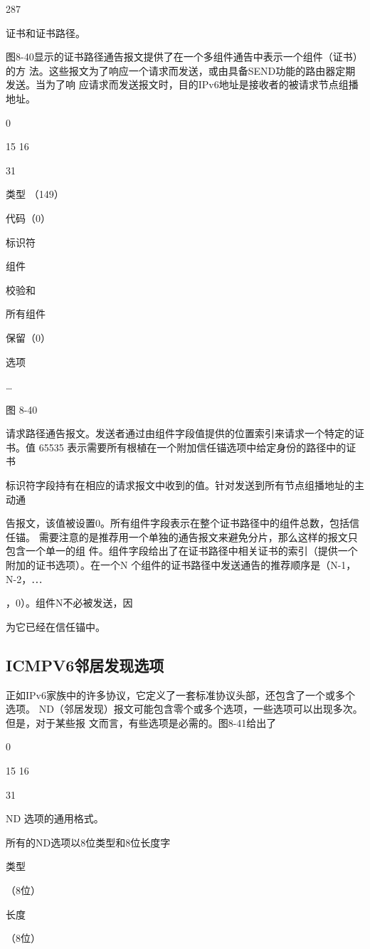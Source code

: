 287

证书和证书路径。

图8-40显示的证书路径通告报文提供了在一个多组件通告中表示一个组件（证书）的方
法。这些报文为了响应一个请求而发送，或由具备SEND功能的路由器定期发送。当为了响
应请求而发送报文时，目的IPv6地址是接收者的被请求节点组播地址。

0

15 16

31

类型 （149）

代码（0）

标识符

组件

校验和

所有组件

保留（0）

选项

…

图 8-40

请求路径通告报文。发送者通过由组件字段值提供的位置索引来请求一个特定的证书。值
65535 表示需要所有根植在一个附加信任锚选项中给定身份的路径中的证书

标识符字段持有在相应的请求报文中收到的值。针对发送到所有节点组播地址的主动通

告报文，该值被设置0。所有组件字段表示在整个证书路径中的组件总数，包括信任锚。
需要注意的是推荐用一个单独的通告报文来避免分片，那么这样的报文只包含一个单一的组
件。组件字段给出了在证书路径中相关证书的索引（提供一个附加的证书选项）。在一个N
个组件的证书路径中发送通告的推荐顺序是（N-1，N-2，⋯

，0）。组件N不必被发送，因

为它已经在信任锚中。

\subsection{ICMPV6邻居发现选项}
正如IPv6家族中的许多协议，它定义了一套标准协议头部，还包含了一个或多个选项。
ND（邻居发现）报文可能包含零个或多个选项，一些选项可以出现多次。但是，对于某些报
文而言，有些选项是必需的。图8-41给出了

0

15 16

31

ND 选项的通用格式。

所有的ND选项以8位类型和8位长度字

类型

（8位）

长度

（8位）

